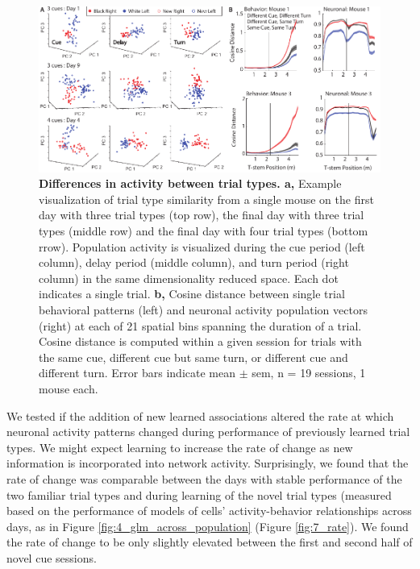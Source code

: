 \begin{figure}
\includegraphics[width=\textwidth]{figures/7_pca_all.pdf}
\caption[Differences in activity between trial types.]{\textbf{Differences in activity between trial types. a,} Example visualization of trial type similarity from a single mouse on the first day with three trial types (top row), the final day with three trial types (middle row) and the final day with four trial types (bottom rrow). Population activity is visualized during the cue period (left column), delay period (middle column), and turn period (right column) in the same dimensionality reduced space. Each dot indicates a single trial. 
%
\textbf{b,} Cosine distance between single trial behavioral patterns (left) and neuronal activity population vectors (right) at each of 21 spatial bins spanning the duration of a trial. Cosine distance is computed within a given session for trials with the same cue, different cue but same turn, or different cue and different turn. Error bars indicate mean $\pm$ sem, n = 19 sessions, 1 mouse each.
\label{fig:7_pca_all}}
\end{figure}

We tested if the addition of new learned associations altered the rate at which neuronal activity patterns changed during performance of previously learned trial types. We might expect learning to increase the rate of change as new information is incorporated into network activity. Surprisingly, we found that the rate of change was comparable between the days with stable performance of the two familiar trial types and during learning of the novel trial types (measured based on the performance of models of cells' activity-behavior relationships across days, as in Figure  \ref{fig:4_glm_across_population} (Figure \ref{fig:7_rate}). We found the rate of change to be only slightly elevated between the first and second half of novel cue sessions.

